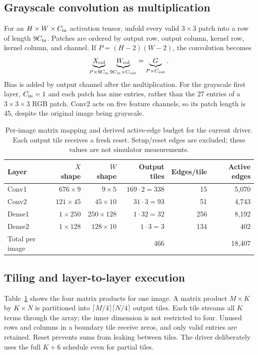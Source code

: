 \documentclass[10pt,twocolumn,letterpaper]{article}
\begin{document}
\subsection{Grayscale convolution as multiplication}
For an $H\times W\times C_{\rm in}$ activation tensor, unfold every valid
$3\times3$ patch into a row of length $9C_{\rm in}$. Patches are ordered by
output row, output column, kernel row, kernel column, and channel. If
$P=(H-2)(W-2)$, the convolution becomes
\begin{equation}
\underbrace{X_{\rm col}}_{P\times9C_{\rm in}}
\underbrace{W_{\rm col}}_{9C_{\rm in}\times C_{\rm out}}
=\underbrace{G}_{P\times C_{\rm out}}.
\end{equation}
Bias is added by output channel after the multiplication. For the grayscale
first layer, $C_{\rm in}=1$ and each patch has nine entries, rather than the
27 entries of a $3\times3\times3$ RGB patch. Conv2 acts on five feature
channels, so its patch length is 45, despite the original image being
grayscale.

\begin{table}[t]\centering\small
\caption{Per-image matrix mapping and derived active-edge budget for the current driver. Each output tile receives a fresh reset. Setup/reset edges are excluded; these values are not simulator measurements.}\label{tab:mapping}
\begin{tabular}{lrrrrr}\toprule
Layer & $X$ shape & $W$ shape & Output tiles & Edges/tile & Active edges\\\midrule
Conv1 & $676\times9$ & $9\times5$ & $169\cdot2=338$ & 15 & 5,070\\
Conv2 & $121\times45$ & $45\times10$ & $31\cdot3=93$ & 51 & 4,743\\
Dense1 & $1\times250$ & $250\times128$ & $1\cdot32=32$ & 256 & 8,192\\
Dense2 & $1\times128$ & $128\times10$ & $1\cdot3=3$ & 134 & 402\\\midrule
Total per image & & & 466 & & 18,407\\\bottomrule
\end{tabular}
\end{table}

\subsection{Tiling and layer-to-layer execution}
Table~\ref{tab:mapping} shows the four matrix products for one image. A
matrix product $M\times K$ by $K\times N$ is partitioned into
$\lceil M/4\rceil\lceil N/4\rceil$ output tiles. Each tile streams all $K$
terms through the array; the inner dimension is not restricted to four.
Unused rows and columns in a boundary tile receive zeros, and only valid
entries are retained. Reset prevents sums from leaking between tiles.
The driver deliberately uses the full $K+6$ schedule even for partial tiles.
\end{document}
